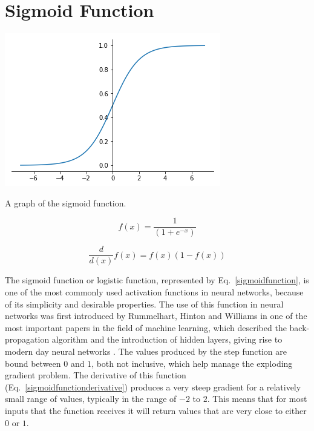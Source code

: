 \section{Sigmoid Function}\label{sec:sigmoid}

\begin{marginfigure}
  \includegraphics{graphics/activation_functions/sigmoid_function.png}
  \label{fig:sigmoidfunction}
  \caption{
    A graph of the sigmoid function.
  }
\end{marginfigure}

\begin{equation}\label{sigmoidfunction}
    f(x) = \frac{1}{(1 + e^{-x})}
\end{equation}

\begin{equation}\label{sigmoidfunctionderivative}
    \frac{d}{d(x)}f(x) = f(x)(1-f(x))
\end{equation}

The sigmoid function or logistic function, represented by  Eq.~\ref{sigmoidfunction}, is one of the most commonly used activation functions in neural networks, because of its simplicity and desirable properties. The use of this function in neural networks was first introduced by Rummelhart, Hinton and Williams in one of the most important papers in the field of machine learning, which described the back-propagation algorithm and the introduction of hidden layers, giving rise to modern day neural networks \citep{DavidE.Rumelhart1986Lrbb}.  The values produced by the step function are bound between $0$ and $1$, both not inclusive, which help manage the exploding gradient problem. The derivative of this function (Eq.~\ref{sigmoidfunctionderivative})  produces a very steep gradient for a relatively small range of values, typically in the range of $-2$ to $2$. This means that for most inputs that the function receives it will return values that are very close to either $0$ or $1$.

